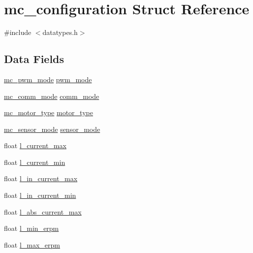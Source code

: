 \hypertarget{structmc__configuration}{}\section{mc\+\_\+configuration Struct Reference}
\label{structmc__configuration}


{\ttfamily \#include $<$datatypes.\+h$>$}

\subsection*{Data Fields}
\begin{DoxyCompactItemize}
\item 
\hyperlink{datatypes_8h_ab42773941483f82a33725d29d4f9e219}{mc\+\_\+pwm\+\_\+mode} \hyperlink{structmc__configuration_a00e6190070063b53a8228af93782341e}{pwm\+\_\+mode}
\item 
\hyperlink{datatypes_8h_af3916564ec22a69f58dea8b020011381}{mc\+\_\+comm\+\_\+mode} \hyperlink{structmc__configuration_a919f219d2e547abef12fe6c33722047d}{comm\+\_\+mode}
\item 
\hyperlink{datatypes_8h_a59128a84c10f85387a6e280750e0a478}{mc\+\_\+motor\+\_\+type} \hyperlink{structmc__configuration_a81f8b91165f3512cdaaa5d6aeebdc0d1}{motor\+\_\+type}
\item 
\hyperlink{datatypes_8h_a0a11775bb4c124eddb597e264fd5004c}{mc\+\_\+sensor\+\_\+mode} \hyperlink{structmc__configuration_a01aeaaa281fbdd5588fce5b61123575f}{sensor\+\_\+mode}
\item 
float \hyperlink{structmc__configuration_a5622ff0a32ac4f1498afad27fc7a2882}{l\+\_\+current\+\_\+max}
\item 
float \hyperlink{structmc__configuration_af72e559680007cb78c16bff9e53c68df}{l\+\_\+current\+\_\+min}
\item 
float \hyperlink{structmc__configuration_a18eb33967c4b308c0940abfdf0b409dc}{l\+\_\+in\+\_\+current\+\_\+max}
\item 
float \hyperlink{structmc__configuration_ace17089c4e598be927685c7058ec0ff5}{l\+\_\+in\+\_\+current\+\_\+min}
\item 
float \hyperlink{structmc__configuration_ae464f58911db79e30bad064b2bf3ada5}{l\+\_\+abs\+\_\+current\+\_\+max}
\item 
float \hyperlink{structmc__configuration_a313a93ffd88ae42465aba4dfbe59f412}{l\+\_\+min\+\_\+erpm}
\item 
float \hyperlink{structmc__configuration_ac8b3bd05050c7087926d28402df9f7c2}{l\+\_\+max\+\_\+erpm}

\end{DoxyCompactItemize}
